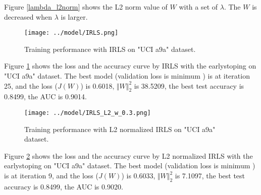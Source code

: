 \documentclass[a4paper]{article}
\begin{document}
Figure \ref{lambda_l2norm} shows the L2 norm value of $W$ with a set of $\lambda$.  The $W$ is decreased when $\lambda$ is larger. 


\begin{figure}[!htbp]
\begin{center}
\texttt{[image: ../model/IRLS.png]}
\end{center}
\caption{Training performance with IRLS on "UCI a9a" dataset.}\label{IRLS}
\end{figure}
Figure \ref{IRLS} shows the loss and the accuracy curve by IRLS with the earlystoping on "UCI a9a" dataset.  The best model (validation loss is minimum ) is at iteration 25, and the loss ($J(W)$) is 0.6018, $\Vert W \Vert_2^2$ is 38.5209, the best test accuracy is 0.8499, the AUC is 0.9014. 

\begin{figure}[!htbp]
\begin{center}
\texttt{[image: ../model/IRLS\_L2\_w\_0.3.png]}
\end{center}
\caption{Training performance with L2 normalized IRLS on "UCI a9a" dataset.}\label{IRLS_L2}
\end{figure}

Figure \ref{IRLS_L2} shows the loss and the accuracy curve by L2 normalized IRLS with the earlystoping on "UCI a9a" dataset.  The best model (validation loss is minimum ) is at iteration 9, and the loss ($J(W)$) is 0.6033, $\Vert W \Vert_2^2$ is 7.1097, the best test accuracy is 0.8499, the AUC is 0.9020. 


%
\end{document}
